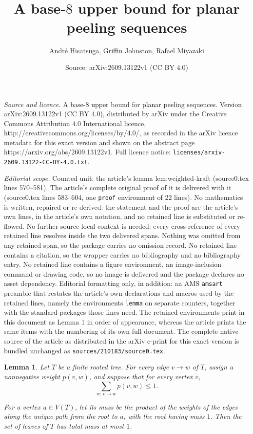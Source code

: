 \documentclass[10pt,a4paper]{amsart}
\title{A base-$8$ upper bound for planar peeling sequences}
\author{Andr\'e Hisatsuga, Griffin Johnston, Rafael Miyazaki}
\date{Source: arXiv:2609.13122v1 (CC BY 4.0)}
\newtheorem{lemma}{Lemma}
\begin{document}
\maketitle

\noindent\emph{Source and licence.} A base-$8$ upper bound for planar peeling sequences. Version arXiv:2609.13122v1 (CC BY 4.0), distributed by arXiv under the Creative Commons Attribution 4.0 International licence, http://creativecommons.org/licenses/by/4.0/, as recorded in the arXiv licence metadata for this exact version and shown on the abstract page https://arxiv.org/abs/2609.13122v1. Full licence notice: \texttt{licenses/arxiv-2609.13122-CC-BY-4.0.txt}.\par\smallskip

\noindent\textit{Editorial scope.} Counted unit: the article's lemma lem:weighted-kraft (source0.tex lines 570--581). The article's complete original proof of it is delivered with it (source0.tex lines 583--604, one \texttt{proof} environment of 22 lines). No mathematics is written, repaired or re-derived: the statement and the proof are the article's own lines, in the article's own notation, and no retained line is substituted or re-flowed.  No further source-local context is needed: every cross-reference of every retained line resolves inside the two delivered spans.  Nothing was omitted from any retained span, so the package carries no omission record.  No retained line contains a citation, so the wrapper carries no bibliography and no bibliography entry.  No retained line contains a figure environment, an image-inclusion command or drawing code, so no image is delivered and the package declares no asset dependency.  Editorial formatting only, in addition: an AMS \texttt{amsart} preamble that restates the article's own declarations and macros used by the retained lines, namely the environments \texttt{lemma} on separate counters, together with the standard packages those lines need.  The retained environments print in this document as Lemma 1 in order of appearance, whereas the article prints the same items with the numbering of its own full document.  The complete native source of the article as distributed in the arXiv e-print for this exact version is bundled unchanged as \texttt{sources/210183/source0.tex}.
\begin{lemma}\label{lem:weighted-kraft}
Let $T$ be a finite rooted tree. 
For every edge $v\to w$ of $T$, assign a
nonnegative weight $p(v,w)$, and suppose that for every vertex $v$,
\begin{equation*}
    \sum_{w:\, v\to w} p(v,w)\le 1.
\end{equation*}

For a vertex $u\in V(T)$, let its mass be the product of the weights
of the edges along the unique path from the root to $u$, with the root
having mass $1$. Then the set of leaves of $T$ has total mass at most $1$.
\end{lemma}
\end{document}
